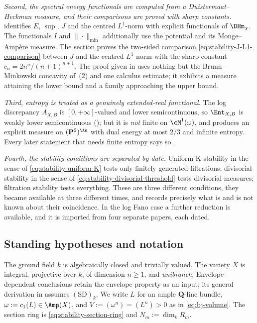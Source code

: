 \emph{Second, the spectral energy functionals are computed from a
Duistermaat--Heckman measure, and their comparisons are proved with
sharp constants.}   identifies $E$, $\sup$, $J$ and
the centred $L^1$-norm with explicit functionals of $\DHm_\chi$.
The functionals $I$ and $\|\cdot\|_{\min}$ additionally use the potential
and its Monge--Amp\`ere measure.  The section proves the two-sided comparison
\eqref{eq:stability-J-L1-comparison} between $J$ and the centred
$L^1$-norm with the sharp constant $c_n=2n^n/(n+1)^{n+1}$.  The proof
given in  uses nothing but the Brunn--Minkowski
concavity of \,(2) and one calculus estimate;
it exhibits a measure attaining the lower bound and a family approaching
the upper bound.

\emph{Third, entropy is treated as a genuinely extended-real functional.}
The log discrepancy $A_{X,B}$ is $[0,+\infty]$-valued and lower
semicontinuous, so $\Ent_{X,B}$ is weakly lower semicontinuous
(); but it is \emph{not} finite on
$\cM^1(\omega)$, and  produces an explicit
measure on $(\mathbf P^2)^{\An}$ with dual energy at most $2/3$ and
infinite entropy.  Every later statement that needs finite entropy says so.

\emph{Fourth, the stability conditions are separated by date.}  Uniform
K-stability in the sense of \eqref{eq:stability-uniform-K} tests only
finitely generated filtrations; divisorial stability in the sense of
\eqref{eq:stability-divisorial-threshold} tests divisorial measures;
filtration stability tests everything.  These are three different
conditions, they became available at three different times, and
 records precisely what is and
is not known about their coincidence.  In the log Fano case a further
reduction is available, and it is imported from four separate papers, each
dated.

\subsection{Standing hypotheses and notation}
\label{sec:ch50-hypotheses}

The ground field $k$ is algebraically closed and trivially valued.  The
variety $X$ is integral, projective over $k$, of dimension $n\ge1$,
and \emph{unibranch}. Envelope-dependent conclusions retain the envelope
property as an input; its general derivation in
assumes $\mathrm{(SD)}_k$. We write $L$ for an ample $\mathbf Q$-line bundle,
$\omega:=c_1(L)\in\Amp(X)$, and $V:=(\omega^n)=(L^n)>0$ as in
\eqref{eq:bj-volume}.  The section ring is \eqref{eq:stability-section-ring}
and $N_m:=\dim_kR_m$.

